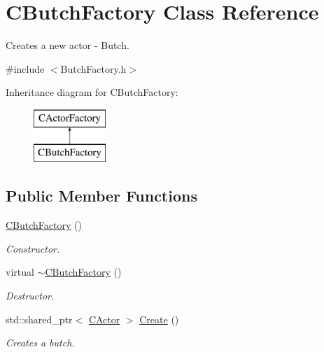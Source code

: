 \hypertarget{class_c_butch_factory}{\section{C\+Butch\+Factory Class Reference}
\label{class_c_butch_factory}
}


Creates a new actor -\/ Butch.  




{\ttfamily \#include $<$Butch\+Factory.\+h$>$}

Inheritance diagram for C\+Butch\+Factory\+:\begin{figure}[H]
\begin{center}
\leavevmode
\includegraphics[height=2.000000cm]{class_c_butch_factory}
\end{center}
\end{figure}
\subsection*{Public Member Functions}
\begin{DoxyCompactItemize}
\item 
\hypertarget{class_c_butch_factory_a74990475edd5f1170ad0653123affdde}{\hyperlink{class_c_butch_factory_a74990475edd5f1170ad0653123affdde}{C\+Butch\+Factory} ()}\label{class_c_butch_factory_a74990475edd5f1170ad0653123affdde}

\begin{DoxyCompactList}\small\item\em Constructor. \end{DoxyCompactList}\item 
\hypertarget{class_c_butch_factory_a6d4786123569b4dd03834e9fe2c83d37}{virtual \hyperlink{class_c_butch_factory_a6d4786123569b4dd03834e9fe2c83d37}{$\sim$\+C\+Butch\+Factory} ()}\label{class_c_butch_factory_a6d4786123569b4dd03834e9fe2c83d37}

\begin{DoxyCompactList}\small\item\em Destructor. \end{DoxyCompactList}\item 
std\+::shared\+\_\+ptr$<$ \hyperlink{class_c_actor}{C\+Actor} $>$ \hyperlink{class_c_butch_factory_afe7d27e222c1b49e05dcda4902b3188f}{Create} ()
\begin{DoxyCompactList}\small\item\em Creates a butch. \end{DoxyCompactList}\end{DoxyCompactItemize}


